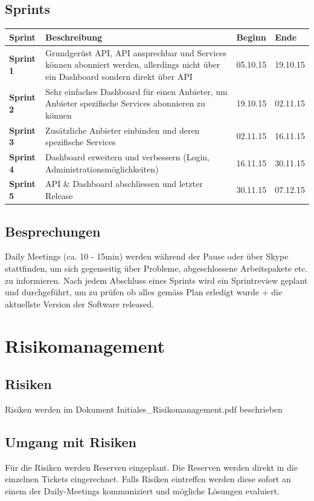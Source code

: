 \documentclass[11pt]{scrartcl}
\begin{document}
\subsection{Sprints}
\begin{tabularx}{\textwidth}{l X l l}
\textbf{Sprint} & \textbf{Beschreibung} & \textbf{Beginn} &  \textbf{Ende} \\
\hline
\textbf{Sprint 1} & Grundgerüst API, API ansprechbar und Services können 
abonniert werden, allerdings nicht über ein Dashboard sondern direkt über API  & 05.10.15 & 19.10.15 \\
\hline
\textbf{Sprint 2} & Sehr einfaches Dashboard für einen Anbieter, 
um Anbieter spezifische Services abonnieren zu können 
& 19.10.15 & 02.11.15 \\
\hline
\textbf{Sprint 3} & Zusätzliche Anbieter einbinden und deren spezifische Services  & 02.11.15 & 16.11.15 \\
\hline
\textbf{Sprint 4} & Dashboard erweitern und verbessern (Login, Administrationsmöglichkeiten) 
& 16.11.15 & 30.11.15 \\
\hline
\textbf{Sprint 5} & API \& Dashboard abschliessen und letzter Release  & 30.11.15 & 07.12.15 \\
\end{tabularx}

\subsection{Besprechungen}
Daily Meetings (ca. 10 - 15min) werden während der Pause oder über Skype stattfinden, um sich 
gegenseitig über Probleme, abgeschlossene Arbeitspakete etc. zu informieren.
Nach jedem Abschluss eines Sprints wird ein Sprintreview geplant und durchgeführt, um zu prüfen 
ob alles gemäss Plan erledigt wurde + die aktuellste Version der Software 
released.
\section{Risikomanagement}
\subsection{Risiken}
Risiken werden im Dokument Initiales\_Risikomanagement.pdf beschrieben
\subsection{Umgang mit Risiken}
Für die Risiken werden Reserven eingeplant. Die Reserven werden direkt in die einzelnen Tickets 
eingerechnet. Falls Risiken eintreffen werden diese sofort an einem der Daily-Meetings kommuniziert 
und mögliche Lösungen evaluiert.
\end{document}
